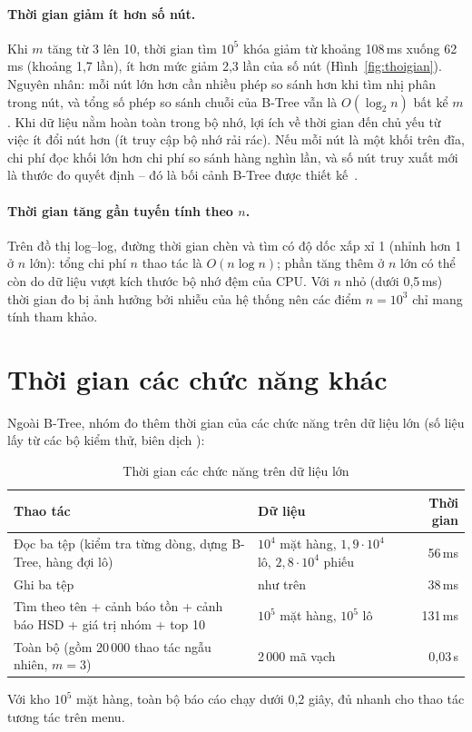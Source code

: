 \paragraph{Thời gian giảm ít hơn số nút.} Khi $m$ tăng từ 3 lên 10, thời gian tìm $10^5$ khóa giảm từ khoảng
108\,ms xuống 62\,ms (khoảng 1,7 lần), ít hơn mức giảm 2,3 lần của số nút (Hình~\ref{fig:thoigian}). Nguyên nhân:
mỗi nút lớn hơn cần nhiều phép so sánh hơn khi tìm nhị phân trong nút, và tổng số phép so sánh chuỗi của B-Tree
vẫn là $O(\log_2 n)$ bất kể $m$. Khi dữ liệu nằm hoàn toàn trong bộ nhớ, lợi ích về thời gian đến chủ yếu từ việc
ít đổi nút hơn (ít truy cập bộ nhớ rải rác). Nếu mỗi nút là một khối trên đĩa, chi phí đọc khối lớn hơn chi phí so
sánh hàng nghìn lần, và số nút truy xuất mới là thước đo quyết định -- đó là bối cảnh B-Tree được thiết
kế~\cite{bayer,comer}.

\paragraph{Thời gian tăng gần tuyến tính theo $n$.} Trên đồ thị log--log, đường thời gian chèn và tìm có độ dốc
xấp xỉ 1 (nhỉnh hơn 1 ở $n$ lớn): tổng chi phí $n$ thao tác là $O(n\log n)$; phần tăng thêm ở $n$ lớn có thể
còn do dữ liệu vượt kích thước bộ nhớ đệm của CPU. Với $n$ nhỏ (dưới 0,5\,ms) thời gian đo bị ảnh hưởng bởi nhiễu của hệ thống
nên các điểm $n = 10^3$ chỉ mang tính tham khảo.

\section{Thời gian các chức năng khác}

Ngoài B-Tree, nhóm đo thêm thời gian của các chức năng trên dữ liệu lớn (số liệu lấy từ các bộ kiểm thử,
biên dịch ):

\begin{table}[htbp]
\centering\small
\caption{Thời gian các chức năng trên dữ liệu lớn}
\label{tab:thoigiankhac}
\begin{tabularx}{\linewidth}{@{}Y p{5.2cm} r@{}}
\toprule
\textbf{Thao tác} & \textbf{Dữ liệu} & \textbf{Thời gian} \\
\midrule
Đọc ba tệp (kiểm tra từng dòng, dựng B-Tree, hàng đợi lô) & $10^4$ mặt hàng, $1{,}9\cdot10^4$ lô, $2{,}8\cdot10^4$ phiếu & 56\,ms \\
Ghi ba tệp & như trên & 38\,ms \\
Tìm theo tên + cảnh báo tồn + cảnh báo HSD + giá trị nhóm + top 10 & $10^5$ mặt hàng, $10^5$ lô & 131\,ms \\
Toàn bộ  (gồm 20\,000 thao tác ngẫu nhiên, $m = 3$) & 2\,000 mã vạch & 0,03\,s \\
\bottomrule
\end{tabularx}
\end{table}

Với kho $10^5$ mặt hàng, toàn bộ báo cáo chạy dưới 0,2 giây, đủ nhanh cho thao tác tương tác trên menu.
